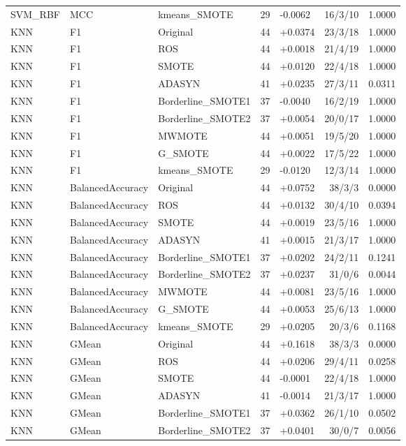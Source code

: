 \documentclass[10pt,a4paper]{article}
\begin{document}
\begin{longtable}{lllllrr}
SVM\_RBF & MCC & kmeans\_SMOTE & 29 & -0.0062 & 16/3/10 & 1.0000 \\
KNN & F1 & Original & 44 & +0.0374 & 23/3/18 & 1.0000 \\
KNN & F1 & ROS & 44 & +0.0018 & 21/4/19 & 1.0000 \\
KNN & F1 & SMOTE & 44 & +0.0120 & 22/4/18 & 1.0000 \\
KNN & F1 & ADASYN & 41 & +0.0235 & 27/3/11 & 0.0311 \\
KNN & F1 & Borderline\_SMOTE1 & 37 & -0.0040 & 16/2/19 & 1.0000 \\
KNN & F1 & Borderline\_SMOTE2 & 37 & +0.0054 & 20/0/17 & 1.0000 \\
KNN & F1 & MWMOTE & 44 & +0.0051 & 19/5/20 & 1.0000 \\
KNN & F1 & G\_SMOTE & 44 & +0.0022 & 17/5/22 & 1.0000 \\
KNN & F1 & kmeans\_SMOTE & 29 & -0.0120 & 12/3/14 & 1.0000 \\
KNN & BalancedAccuracy & Original & 44 & +0.0752 & 38/3/3 & 0.0000 \\
KNN & BalancedAccuracy & ROS & 44 & +0.0132 & 30/4/10 & 0.0394 \\
KNN & BalancedAccuracy & SMOTE & 44 & +0.0019 & 23/5/16 & 1.0000 \\
KNN & BalancedAccuracy & ADASYN & 41 & +0.0015 & 21/3/17 & 1.0000 \\
KNN & BalancedAccuracy & Borderline\_SMOTE1 & 37 & +0.0202 & 24/2/11 & 0.1241 \\
KNN & BalancedAccuracy & Borderline\_SMOTE2 & 37 & +0.0237 & 31/0/6 & 0.0044 \\
KNN & BalancedAccuracy & MWMOTE & 44 & +0.0081 & 23/5/16 & 1.0000 \\
KNN & BalancedAccuracy & G\_SMOTE & 44 & +0.0053 & 25/6/13 & 1.0000 \\
KNN & BalancedAccuracy & kmeans\_SMOTE & 29 & +0.0205 & 20/3/6 & 0.1168 \\
KNN & GMean & Original & 44 & +0.1618 & 38/3/3 & 0.0000 \\
KNN & GMean & ROS & 44 & +0.0206 & 29/4/11 & 0.0258 \\
KNN & GMean & SMOTE & 44 & -0.0001 & 22/4/18 & 1.0000 \\
KNN & GMean & ADASYN & 41 & -0.0014 & 21/3/17 & 1.0000 \\
KNN & GMean & Borderline\_SMOTE1 & 37 & +0.0362 & 26/1/10 & 0.0502 \\
KNN & GMean & Borderline\_SMOTE2 & 37 & +0.0401 & 30/0/7 & 0.0056 \\

\end{longtable}
\end{document}
